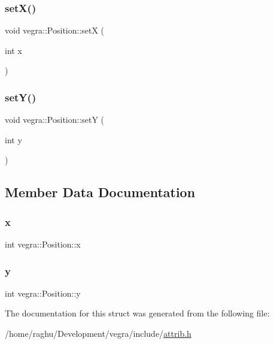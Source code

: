 \mbox{\label{structvegra_1_1Position_a2accdc2782f0a67a529633c2c2125fe7}} 
\subsubsection{\texorpdfstring{set\+X()}{setX()}}
{\footnotesize\ttfamily void vegra\+::\+Position\+::setX (\begin{DoxyParamCaption}\item[{int}]{x }\end{DoxyParamCaption})\hspace{0.3cm}{\ttfamily [inline]}}

\mbox{\label{structvegra_1_1Position_a1930518a71651b723688490e3adbe196}} 
\subsubsection{\texorpdfstring{set\+Y()}{setY()}}
{\footnotesize\ttfamily void vegra\+::\+Position\+::setY (\begin{DoxyParamCaption}\item[{int}]{y }\end{DoxyParamCaption})\hspace{0.3cm}{\ttfamily [inline]}}



\subsection{Member Data Documentation}
\mbox{\label{structvegra_1_1Position_a458595c84391b5ae3bdc0c8d256706b6}} 
\subsubsection{\texorpdfstring{x}{x}}
{\footnotesize\ttfamily int vegra\+::\+Position\+::x}

\mbox{\label{structvegra_1_1Position_a2e90d89fd65b914fe6b6157c2d20d90c}} 
\subsubsection{\texorpdfstring{y}{y}}
{\footnotesize\ttfamily int vegra\+::\+Position\+::y}



The documentation for this struct was generated from the following file\+:\begin{DoxyCompactItemize}
\item 
/home/raghu/\+Development/vegra/include/\mbox{\hyperlink{attrib_8h}{attrib.\+h}}\end{DoxyCompactItemize}
